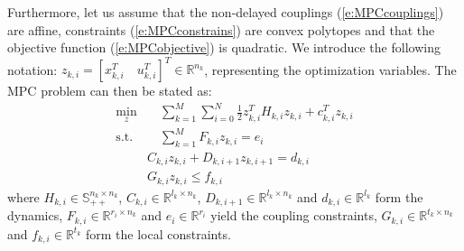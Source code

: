Furthermore, let us assume that the non-delayed couplings (\ref{e:MPCcouplings}) are affine, constraints (\ref{e:MPCconstrains}) are convex polytopes and that the objective function (\ref{e:MPCobjective}) is quadratic. We introduce the following notation: $z_{k,i} = [x_{k,i}^T \quad u_{k,i}^T]^T \in \mathbb{R}^{n_{k}}$, representing the optimization variables. The MPC problem can then be stated as:
\begin{subequations}
\label{e:problem}
\begin{align}
\min_z & \quad \sum_{k=1}^{M} \sum_{i=0}^N \frac{1}{2}z_{k,i}^TH_{k,i}z_{k,i} + c_{k,i}^Tz_{k,i} \label{e:1} \\
\text{s.t.} & \quad \sum_{k=1}^{M} F_{k,i}z_{k,i} = e_i \label{e:CoupConstControl} \\
& C_{k,i}z_{k,i} + D_{k,i+1}z_{k,i+1} = d_{k,i}  \label{e:dynamics} \\
& G_{k,i}z_{k,i} \leq f_{k,i}
\end{align}
\end{subequations}
where $H_{k,i} \in \mathbb{S}_{++}^{n_{k} \times n_{k}}$, $C_{k,i} \in \mathbb{R}^{l_{k} \times n_{k}}$, $D_{k,i+1} \in \mathbb{R}^{l_{k} \times n_{k}}$ and $d_{k,i} \in \mathbb{R}^{l_{k}}$ form the dynamics, $F_{k,i} \in \mathbb{R}^{r_{i} \times n_{k}}$ and $e_i \in \mathbb{R}^{r_i}$ yield the coupling constraints, $G_{k,i} \in \mathbb{R}^{t_{k} \times n_{k}}$ and $f_{k,i} \in \mathbb{R}^{t_{k}}$ form the local constraints.

